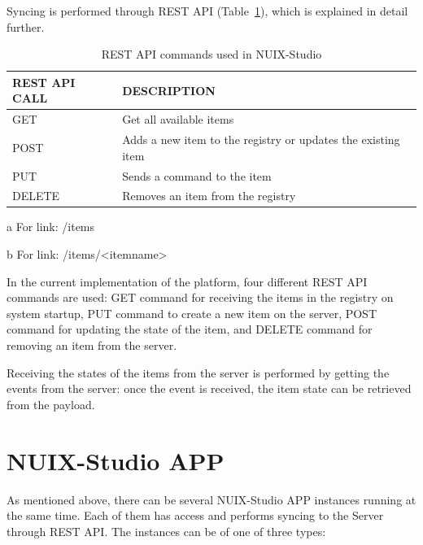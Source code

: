 Syncing is performed through REST API (Table~\ref{tab:rest-api-table}), which is explained in detail further.

\begin{table}
  \centering
  \begin{threeparttable}[c]
    \caption{REST API commands used in NUIX-Studio}
    \label{tab:rest-api-table}
    \begin{tabular}{ll}
      \toprule
      REST API CALL    &         DESCRIPTION                 \\
      \midrule
      GET\tnote{a} & Get all available items \\
      POST\tnote{b} & Adds a new item to the registry or updates the existing item    \\
      PUT\tnote{b}        & Sends a command to the item                              \\
      DELETE\tnote{b}        & Removes an item from the registry          \\
      \bottomrule
    \end{tabular}
    \begin{tablenotes}
      \item [a] For link: /items
      \item [b] For link: /items/<itemname>
    \end{tablenotes}
  \end{threeparttable}
\end{table}

In the current implementation of the platform, four different REST API commands are used: GET command for receiving the items in the registry on system startup, PUT command to create a new item on the server, POST command for updating the state of the item, and DELETE command for removing an item from the server.

Receiving the states of the items from the server is performed by getting the events from the server: once the event is received, the item state can be retrieved from the payload.

\section{NUIX-Studio APP}

As mentioned above, there can be several NUIX-Studio APP instances running at the same time. Each of them has access and performs syncing to the Server through REST API. The instances can be of one of three types:

